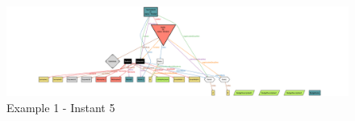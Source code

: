 \begin{figure}[H]
    \centering
    \includegraphics[angle=90,origin=c, height=0.91\textwidth]{alloy/images/example1_5.png}
    \caption{Example 1 - Instant 5}
\end{figure}
